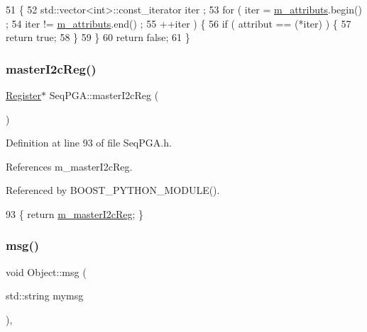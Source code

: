 \begin{DoxyCode}
51   \{
52     std::vector<int>::const\_iterator iter ;
53     \textcolor{keywordflow}{for} ( iter  = \hyperlink{classAttrib_ac4bd58a0cc6b38a3b711d609a3d3aacc}{m\_attributs}.begin() ;
54           iter != \hyperlink{classAttrib_ac4bd58a0cc6b38a3b711d609a3d3aacc}{m\_attributs}.end()   ;
55           ++iter ) \{
56       \textcolor{keywordflow}{if} ( attribut == (*iter) ) \{
57         \textcolor{keywordflow}{return} \textcolor{keyword}{true};
58       \}
59     \}
60     \textcolor{keywordflow}{return} \textcolor{keyword}{false};
61   \}
\end{DoxyCode}
\mbox{\label{classSeqPGA_a3906fe0cdfd9042a67c0fa35ae75147a}} 
\subsubsection{\texorpdfstring{master\+I2c\+Reg()}{masterI2cReg()}}
{\footnotesize\ttfamily \hyperlink{classRegister}{Register}$\ast$ Seq\+P\+G\+A\+::master\+I2c\+Reg (\begin{DoxyParamCaption}{ }\end{DoxyParamCaption})\hspace{0.3cm}{\ttfamily [inline]}}



Definition at line 93 of file Seq\+P\+G\+A.\+h.



References m\+\_\+master\+I2c\+Reg.



Referenced by B\+O\+O\+S\+T\+\_\+\+P\+Y\+T\+H\+O\+N\+\_\+\+M\+O\+D\+U\+L\+E().


\begin{DoxyCode}
93 \{ \textcolor{keywordflow}{return} \hyperlink{classSeqPGA_a942c71b33a4f43b7a994cb9216abb17e}{m\_masterI2cReg}; \}
\end{DoxyCode}
\mbox{\label{classObject_a58b2d0618c2d08cf2383012611528d97}} 
\subsubsection{\texorpdfstring{msg()}{msg()}\hspace{0.1cm}{\footnotesize\ttfamily [1/2]}}
{\footnotesize\ttfamily void Object\+::msg (\begin{DoxyParamCaption}\item[{std\+::string}]{mymsg }\end{DoxyParamCaption})\hspace{0.3cm}{\ttfamily [inline]}, {\ttfamily [inherited]}}



